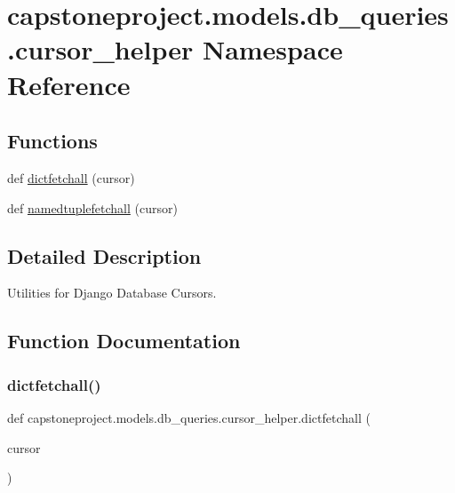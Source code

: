 \hypertarget{namespacecapstoneproject_1_1models_1_1db__queries_1_1cursor__helper}{}\section{capstoneproject.\+models.\+db\+\_\+queries.\+cursor\+\_\+helper Namespace Reference}
\label{namespacecapstoneproject_1_1models_1_1db__queries_1_1cursor__helper}
\subsection*{Functions}
\begin{DoxyCompactItemize}
\item 
def \mbox{\hyperlink{namespacecapstoneproject_1_1models_1_1db__queries_1_1cursor__helper_ad864d8cf48dd4ba7ba9fce01de5a1e45}{dictfetchall}} (cursor)
\item 
def \mbox{\hyperlink{namespacecapstoneproject_1_1models_1_1db__queries_1_1cursor__helper_ad8d9e0fa73723ae2c0894800f231438e}{namedtuplefetchall}} (cursor)
\end{DoxyCompactItemize}


\subsection{Detailed Description}
\begin{DoxyVerb}Utilities for Django Database Cursors.\end{DoxyVerb}
 

\subsection{Function Documentation}
\mbox{\label{namespacecapstoneproject_1_1models_1_1db__queries_1_1cursor__helper_ad864d8cf48dd4ba7ba9fce01de5a1e45}} 
\subsubsection{\texorpdfstring{dictfetchall()}{dictfetchall()}}
{\footnotesize\ttfamily def capstoneproject.\+models.\+db\+\_\+queries.\+cursor\+\_\+helper.\+dictfetchall (\begin{DoxyParamCaption}\item[{}]{cursor }\end{DoxyParamCaption})}

